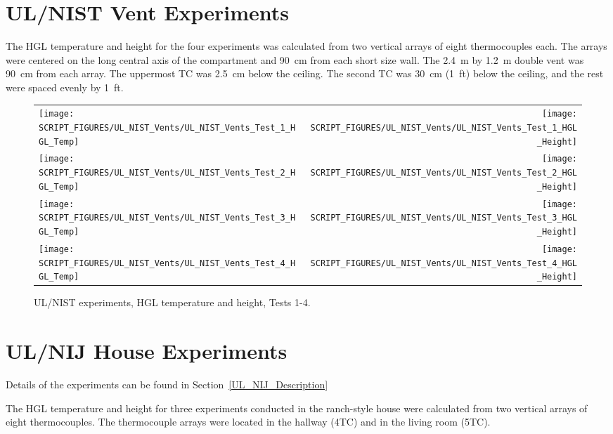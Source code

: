 \section{UL/NIST Vent Experiments}

The HGL temperature and height for the four experiments was calculated from two vertical arrays of eight thermocouples each. The arrays were centered on the long central axis of the compartment and 90~cm from each short size wall. The 2.4~m by 1.2~m double vent was 90~cm from each array. The uppermost TC was 2.5~cm below the ceiling. The second TC was 30~cm (1~ft) below the ceiling, and the rest were spaced evenly by 1~ft.

\newpage

\begin{figure}[p]
\begin{tabular*}{\textwidth}{l@{\extracolsep{\fill}}r}
\texttt{[image: SCRIPT\_FIGURES/UL\_NIST\_Vents/UL\_NIST\_Vents\_Test\_1\_HGL\_Temp]} &
\texttt{[image: SCRIPT\_FIGURES/UL\_NIST\_Vents/UL\_NIST\_Vents\_Test\_1\_HGL\_Height]} \\
\texttt{[image: SCRIPT\_FIGURES/UL\_NIST\_Vents/UL\_NIST\_Vents\_Test\_2\_HGL\_Temp]} &
\texttt{[image: SCRIPT\_FIGURES/UL\_NIST\_Vents/UL\_NIST\_Vents\_Test\_2\_HGL\_Height]} \\
\texttt{[image: SCRIPT\_FIGURES/UL\_NIST\_Vents/UL\_NIST\_Vents\_Test\_3\_HGL\_Temp]} &
\texttt{[image: SCRIPT\_FIGURES/UL\_NIST\_Vents/UL\_NIST\_Vents\_Test\_3\_HGL\_Height]} \\
\texttt{[image: SCRIPT\_FIGURES/UL\_NIST\_Vents/UL\_NIST\_Vents\_Test\_4\_HGL\_Temp]} &
\texttt{[image: SCRIPT\_FIGURES/UL\_NIST\_Vents/UL\_NIST\_Vents\_Test\_4\_HGL\_Height]}
\end{tabular*}
\caption[UL/NIST experiments, HGL temperature and height, Tests 1-4]
{UL/NIST experiments, HGL temperature and height, Tests 1-4.}
\label{UL_NIST_HGL}
\end{figure}

\clearpage

\section{UL/NIJ House Experiments}

Details of the experiments can be found in Section~\ref{UL_NIJ_Description}

The HGL temperature and height for three experiments conducted in the ranch-style house were calculated from two vertical arrays of eight thermocouples. The thermocouple arrays were located in the hallway (4TC) and in the living room (5TC). 

